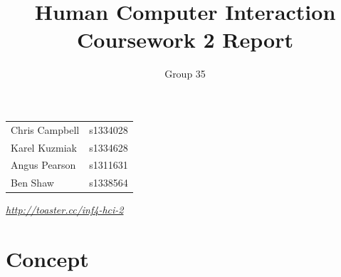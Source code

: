 \documentclass[a4paper, notoc]{tufte-handout}
\title{Human Computer Interaction\\ Coursework 2 Report}
\author{Group 35}
\begin{document}
\maketitle %
\vspace{1em}
\noindent
\begin{tabular}{l r}
  Chris Campbell & s1334028\\
  Karel Kuzmiak  & s1334628\\
  Angus Pearson  & s1311631\\
  Ben Shaw       & s1338564\\
\end{tabular}


\vspace{1em}
\noindent
\href{http://toaster.cc/inf4-hci-2}{\textit{http://toaster.cc/inf4-hci-2}}

\section{Concept}\label{sec:concept}
\end{document}
